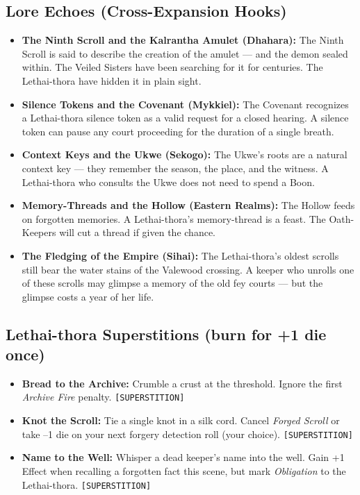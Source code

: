 \subsection*{Lore Echoes (Cross-Expansion Hooks)}
\begin{itemize}
  \item \textbf{The Ninth Scroll and the Kalrantha Amulet (Dhahara):} The Ninth Scroll is said to describe the creation of the amulet --- and the demon sealed within. The Veiled Sisters have been searching for it for centuries. The Lethai-thora have hidden it in plain sight.
  \item \textbf{Silence Tokens and the Covenant (Mykkiel):} The Covenant recognizes a Lethai-thora silence token as a valid request for a closed hearing. A silence token can pause any court proceeding for the duration of a single breath.
  \item \textbf{Context Keys and the Ukwe (Sekogo):} The Ukwe's roots are a natural context key --- they remember the season, the place, and the witness. A Lethai-thora who consults the Ukwe does not need to spend a Boon.
  \item \textbf{Memory-Threads and the Hollow (Eastern Realms):} The Hollow feeds on forgotten memories. A Lethai-thora's memory-thread is a feast. The Oath-Keepers will cut a thread if given the chance.
  \item \textbf{The Fledging of the Empire (Sihai):} The Lethai-thora's oldest scrolls still bear the water stains of the Valewood crossing. A keeper who unrolls one of these scrolls may glimpse a memory of the old fey courts --- but the glimpse costs a year of her life.
\end{itemize}

\subsection*{Lethai-thora Superstitions (burn for +1 die once)}
\begin{itemize}
  \item \textbf{Bread to the Archive:} Crumble a crust at the threshold. Ignore the first \textit{Archive Fire} penalty. \texttt{[SUPERSTITION]}
  \item \textbf{Knot the Scroll:} Tie a single knot in a silk cord. Cancel \textit{Forged Scroll} or take --1 die on your next forgery detection roll (your choice). \texttt{[SUPERSTITION]}
  \item \textbf{Name to the Well:} Whisper a dead keeper's name into the well. Gain +1 Effect when recalling a forgotten fact this scene, but mark \textit{Obligation} to the Lethai-thora. \texttt{[SUPERSTITION]}
\end{itemize}


